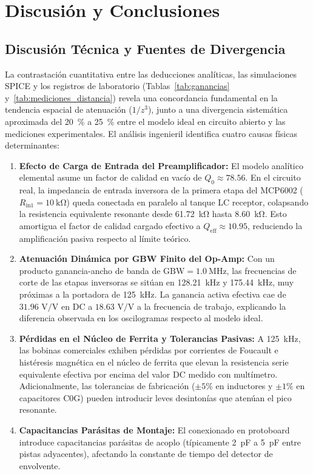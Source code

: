 \section{Discusión y Conclusiones}
\label{sec:discusion_conclusiones}

\subsection{Discusión Técnica y Fuentes de Divergencia}
\label{subsec:discusion_tecnica}

La contrastación cuantitativa entre las deducciones analíticas, las simulaciones SPICE y los registros de laboratorio (Tablas~\ref{tab:ganancias} y~\ref{tab:mediciones_distancia}) revela una concordancia fundamental en la tendencia espacial de atenuación ($1/z^3$), junto a una divergencia sistemática aproximada del \SI{20}{\percent} a \SI{25}{\percent} entre el modelo ideal en circuito abierto y las mediciones experimentales. El análisis ingenieril identifica cuatro causas físicas determinantes:

\begin{enumerate}
    \item \textbf{Efecto de Carga de Entrada del Preamplificador:} El modelo analítico elemental asume un factor de calidad en vacío de $Q_0 \approx 78.56$. En el circuito real, la impedancia de entrada inversora de la primera etapa del MCP6002 ($R_{\text{in1}} = \SI{10}{\kilo\ohm}$) queda conectada en paralelo al tanque LC receptor, colapsando la resistencia equivalente resonante desde \SI{61.72}{\kilo\ohm} hasta \SI{8.60}{\kilo\ohm}. Esto amortigua el factor de calidad cargado efectivo a $Q_{\text{eff}} \approx 10.95$, reduciendo la amplificación pasiva respecto al límite teórico.
    \item \textbf{Atenuación Dinámica por GBW Finito del Op-Amp:} Con un producto ganancia-ancho de banda de $\text{GBW} = \SI{1.0}{\mega\hertz}$, las frecuencias de corte de las etapas inversoras se sitúan en \SI{128.21}{\kilo\hertz} y \SI{175.44}{\kilo\hertz}, muy próximas a la portadora de \SI{125}{\kilo\hertz}. La ganancia activa efectiva cae de $31.96\text{ V/V}$ en DC a $18.63\text{ V/V}$ a la frecuencia de trabajo, explicando la diferencia observada en los oscilogramas respecto al modelo ideal.
    \item \textbf{Pérdidas en el Núcleo de Ferrita y Tolerancias Pasivas:} A \SI{125}{\kilo\hertz}, las bobinas comerciales exhiben pérdidas por corrientes de Foucault e histéresis magnética en el núcleo de ferrita que elevan la resistencia serie equivalente efectiva por encima del valor DC medido con multímetro. Adicionalmente, las tolerancias de fabricación ($\pm 5\%$ en inductores y $\pm 1\%$ en capacitores C0G) pueden introducir leves desintonías que atenúan el pico resonante.
    \item \textbf{Capacitancias Parásitas de Montaje:} El conexionado en protoboard introduce capacitancias parásitas de acoplo (típicamente \SI{2}{\pico\farad} a \SI{5}{\pico\farad} entre pistas adyacentes), afectando la constante de tiempo del detector de envolvente.
\end{enumerate}

